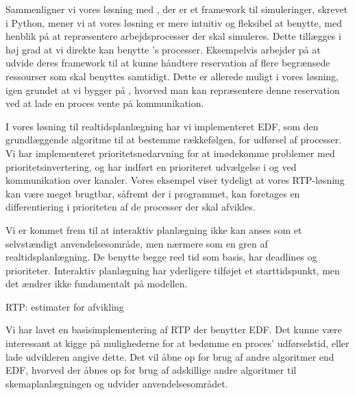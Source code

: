 Sammenligner vi vores løsning med \simpy, der er et framework til simuleringer, skrevet i Python, mener vi at vores løsning er mere intuitiv og fleksibel at benytte, med henblik på at repræsentere arbejdsprocesser der skal simuleres. Dette tillægges i høj grad at vi direkte kan benytte \pycsp's processer. Eksempelvis arbejder \simpy på at udvide deres framework til at kunne håndtere reservation af flere begrænsede ressourser som skal benyttes samtidigt. Dette er allerede muligt i vores løsning, igen grundet at vi bygger på \pycsp, hvorved man kan repræsentere denne reservation ved at lade en proces vente på kommunikation. 

I vores løsning til realtidsplanlægning har vi implementeret EDF, som den grundlæggende algoritme til at bestemme rækkefølgen, for udførsel af processer. Vi har implementeret prioritetsnedarvning for at imødekomme problemer med prioritetsinvertering, og har indført en prioriteret udvælgelse i  og ved kommunikation over kanaler. Vores eksempel viser tydeligt at vores RTP-løsning kan være meget brugtbar, såfremt der i programmet, kan foretages en differentiering i prioriteten af de processer der skal afvikles. 

Vi er kommet frem til at interaktiv planlægning ikke kan anses som et selvstændigt anvendelsesområde, men nærmere som en gren af realtidsplanlægning. De benytte begge reel tid som basis, har deadlines og prioriteter. Interaktiv planlægning har yderligere tilføjet et starttidspunkt, men det ændrer ikke fundamentalt på modellen. 


RTP: estimater for afvikling


Vi har lavet en basisimplementering af RTP der benytter EDF. Det kunne være interessant at kigge på mulighederne for at bedømme en proces' udførselstid, eller lade udvikleren angive dette. Det vil åbne op for brug af andre algoritmer end EDF, hvorved der åbnes op for brug af adskillige andre algoritmer til skemaplanlægningen og udvider anvendelsesområdet.  









